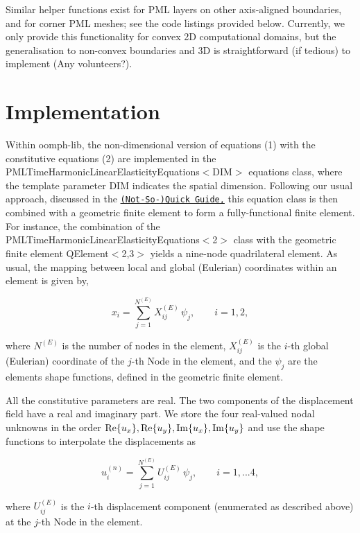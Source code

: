 Similar helper functions exist for P\+ML layers on other axis-\/aligned boundaries, and for corner P\+ML meshes; see the code listings provided below. Currently, we only provide this functionality for convex 2D computational domains, but the generalisation to non-\/convex boundaries and 3D is straightforward (if tedious) to implement (Any volunteers?).



 

\hypertarget{index_element_types}{}\section{Implementation}\label{index_element_types}
Within {\ttfamily oomph-\/lib}, the non-\/dimensional version of equations (1) with the constitutive equations (2) are implemented in the {\ttfamily P\+M\+L\+Time\+Harmonic\+Linear\+Elasticity\+Equations$<$\+D\+I\+M$>$} equations class, where the template parameter {\ttfamily D\+IM} indicates the spatial dimension. Following our usual approach, discussed in the \href{../../../doc/quick_guide/html/index.html}{\tt (Not-\/\+So-\/)Quick Guide,} this equation class is then combined with a geometric finite element to form a fully-\/functional finite element. For instance, the combination of the {\ttfamily P\+M\+L\+Time\+Harmonic\+Linear\+Elasticity\+Equations$<$2$>$} class with the geometric finite element {\ttfamily Q\+Element$<$2,3$>$} yields a nine-\/node quadrilateral element. As usual, the mapping between local and global (Eulerian) coordinates within an element is given by, \begin{center} \[ x_i = \sum_{j=1}^{N^{(E)}} X^{(E)}_{ij} \, \psi_j, \qquad i=1,2, \] \end{center}  where $ N^{(E)} $ is the number of nodes in the element, $ X^{(E)}_{ij} $ is the $ i $-\/th global (Eulerian) coordinate of the $ j $-\/th {\ttfamily Node} in the element, and the $ \psi_j $ are the element\textquotesingle{}s shape functions, defined in the geometric finite element.

All the constitutive parameters are real. The two components of the displacement field have a real and imaginary part. We store the four real-\/valued nodal unknowns in the order $ {\rm Re}\{u_x\}, {\rm Re}\{u_y\}, {\rm Im}\{u_x\}, {\rm Im}\{u_y\} $ and use the shape functions to interpolate the displacements as \begin{center} \[ u_i^{(n)} = \sum_{j=1}^{N^{(E)}} U^{(E)}_{ij} \, \psi_j, \qquad i=1,...4, \] \end{center}  where $ U^{(E)}_{ij} $ is the $ i $-\/th displacement component (enumerated as described above) at the $ j $-\/th {\ttfamily Node} in the element.



